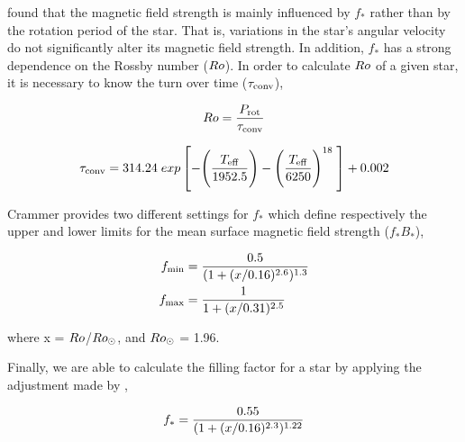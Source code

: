 \documentclass[fleqn,usenatbib]{mnras}
\begin{document}
\cite{Cranmer2011} found that the magnetic field strength is mainly influenced by $f_*$ rather than by the rotation period of the star. That is, variations in the star's angular velocity do not significantly alter its magnetic field strength. In addition, $f_*$ has a strong dependence on the Rossby number ($Ro$). In order to calculate $Ro$ of a given star, it is necessary to know the turn over time ($\tau_{\mathrm{conv}}$),
\begin{ceqn}
\begin{equation}
    Ro = \frac{P_{\mathrm{rot}}}{\tau_{\mathrm{conv}}} \label{eq:mf_rossby}
\end{equation}
\begin{ceqn}
\begin{equation}
    \tau_{\mathrm{conv}} = 314.24\;exp\left[-\Bigg(\frac{T_{\mathrm{eff}}}{1952.5}\Bigg)-\Bigg(\frac{T_{\mathrm{eff}}}{6250}\Bigg)^{18} \;\right]+0.002 \label{eq:mf_turnover}
\end{equation}

\end{ceqn}
\cite{Cranmer2011} Crammer provides two different settings for $f_*$ which define respectively the upper and lower limits for the mean surface magnetic field strength ($f_*B_*$),

\begin{ceqn}
\begin{align}
     f_{\mathrm{min}} &= \frac{0.5}{(1+(x/0.16)^{2.6})^{1.3}} \label{eq:fmin}\\
     f_{\mathrm{max}} &= \frac{1}{1+(x/0.31)^{2.5}} \label{eq:fmax}
\end{align}
\end{ceqn}
where x = $Ro$/$Ro_\odot$, and $Ro_\odot$ = 1.96.


Finally, we are able to calculate the filling factor for a star by applying the adjustment made by \cite{Gallet2013},
\begin{ceqn}
\begin{equation}
     f_{\mathrm{*}} = \frac{0.55}{(1+(x/0.16)^{2.3})^{1.22}} \label{eq:fstart}
\end{equation}
\end{ceqn}


\end{ceqn}
\end{document}
